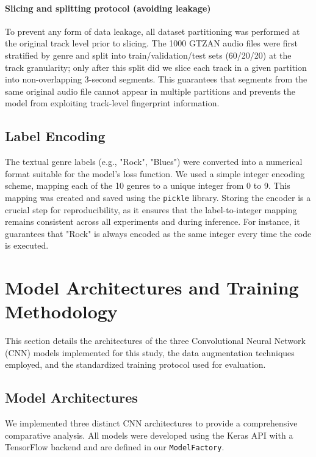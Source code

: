 \documentclass[11pt,a4paper]{article}
\begin{document}
\paragraph{Slicing and splitting protocol (avoiding leakage)}
To prevent any form of data leakage, all dataset partitioning was performed at the original track level prior to slicing. The 1000 GTZAN audio files were first stratified by genre and split into train/validation/test sets (60/20/20) at the track granularity; only after this split did we slice each track in a given partition into non-overlapping 3-second segments. This guarantees that segments from the same original audio file cannot appear in multiple partitions and prevents the model from exploiting track-level fingerprint information.

\subsection{Label Encoding}
The textual genre labels (e.g., "Rock", "Blues") were converted into a numerical format suitable for the model's loss function. We used a simple integer encoding scheme, mapping each of the 10 genres to a unique integer from 0 to 9. This mapping was created and saved using the \texttt{pickle} library. Storing the encoder is a crucial step for reproducibility, as it ensures that the label-to-integer mapping remains consistent across all experiments and during inference. For instance, it guarantees that "Rock" is always encoded as the same integer every time the code is executed.

\section{Model Architectures and Training Methodology}
\label{sec:methodology}
This section details the architectures of the three Convolutional Neural Network (CNN) models implemented for this study, the data augmentation techniques employed, and the standardized training protocol used for evaluation.

\subsection{Model Architectures}
We implemented three distinct CNN architectures to provide a comprehensive comparative analysis. All models were developed using the Keras API with a TensorFlow backend and are defined in our \texttt{ModelFactory}.
\end{document}
